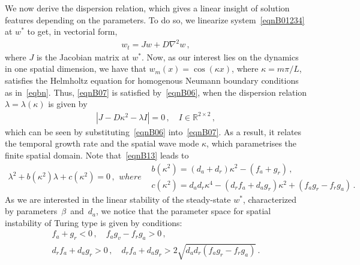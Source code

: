 \documentclass[%
 preprint,
 aip, 
 amsmath,amssymb,
]{revtex4-2}
\begin{document}
We now derive the dispersion relation, which gives a linear insight of solution features depending on the parameters. To do so, we linearize system~\eqref{eqnB01234} at $w^*$ to get, in vectorial form,
	\begin{gather}\label{eqnB07}
	w_t = Jw + D \nabla^2 w	\,,
	\end{gather}
	where $J$ is the Jacobian matrix at $w^*$. Now, as our interest lies on the dynamics in one spatial dimension, we have that $w_m(x)=\cos(\kappa x)$, where $\kappa=m\pi/L$, satisfies the Helmholtz equation for homogenous Neumann boundary conditions as in~\eqref{eqbn}. Thus, \eqref{eqnB07} is satisfied by~\eqref{eqnB06}, when the dispersion relation $\lambda=\lambda(\kappa)$ is given by
	\begin{gather}\label{eqnB13}
	|J-D\kappa^2-\lambda I|=0\,, \quad I\in\mathbb{R}^{2\times2}\,,
	\end{gather}
	which can be seen by substituting~\eqref{eqnB06} into~\eqref{eqnB07}. As a result, it relates the temporal growth rate and the spatial wave mode $\kappa$, which parametrises the finite spatial domain. Note that~\eqref{eqnB13} leads to 
	\begin{subequations}\label{eq:lambda}
		\begin{gather}\label{eqnB14}
		\lambda^2 + b(\kappa^2)\lambda + c(\kappa^2) =0\,,
		\end{gather}
		where
		\begin{flalign}
		& b(\kappa^2)=(d_a+d_r)\kappa^2 -(f_a+g_r)\,, \label{eqnB15} \\
		& c(\kappa^2)=d_ad_r\kappa^4-(d_rf_a+d_ag_r)\kappa^2+ (f_ag_r-f_rg_a) \,.\label{eqnB16}
		\end{flalign}
	\end{subequations}
As we are interested in the linear stability of the steady-state $w^*$, characterized by parameters~$\beta$~and~$d_a$, we notice that the parameter space for spatial instability of Turing type is given by conditions: 
\begin{subequations} \label{eqnB17}
	\begin{gather}
	f_a+g_r<0\,, \quad f_ag_v-f_rg_a>0 \,, \label{eqnB18} \\
	d_rf_a + d_ag_r > 0 \,, \quad d_rf_a + d_ag_r > 2\sqrt{d_ad_r(f_ag_r-f_rg_a)} \,. \label{eqnB20}%
	\end{gather}
\end{subequations} 
\end{document}
